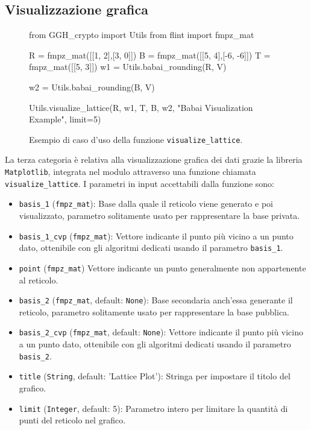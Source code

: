 \subsection{Visualizzazione grafica}

\begin{figure}[h]
    \begin{python}
        from GGH_crypto import Utils
        from flint import fmpz_mat

        R = fmpz_mat([[1, 2],[3, 0]])
        B = fmpz_mat([[5, 4],[-6, -6]])
        T = fmpz_mat([[5, 3]])
        w1 = Utils.babai_rounding(R, V)

        w2 = Utils.babai_rounding(B, V)

        Utils.visualize_lattice(R, w1, T, B, w2, 
                        "Babai Visualization Example", limit=5)
    \end{python}
    \caption{Esempio di caso d'uso della funzione \texttt{visualize\_lattice}.}
    \label{fig:babaivisualizationcode}
\end{figure}

La terza categoria è relativa alla visualizzazione grafica dei dati grazie la libreria
\texttt{Matplotlib}, integrata nel modulo attraverso una funzione chiamata 
\texttt{visualize\_lattice}. I parametri in input accettabili dalla funzione sono:
\begin{itemize}
    \item \texttt{basis\_1} (\texttt{fmpz\_mat}): 
    Base dalla quale il reticolo viene generato e poi visualizzato, parametro solitamente
    usato per rappresentare la base privata. 
    \item \texttt{basis\_1\_cvp} (\texttt{fmpz\_mat}): 
    Vettore indicante il punto più vicino a un punto dato, ottenibile con gli algoritmi 
    dedicati usando il parametro \texttt{basis\_1}. 
    \item \texttt{point} (\texttt{fmpz\_mat})
    Vettore indicante un punto generalmente non appartenente al reticolo.
    \item \texttt{basis\_2} (\texttt{fmpz\_mat}, default: \texttt{None}): 
    Base secondaria anch'essa generante il reticolo, parametro solitamente
    usato per rappresentare la base pubblica. 
    \item \texttt{basis\_2\_cvp} (\texttt{fmpz\_mat}, default: \texttt{None}): 
    Vettore indicante il punto più vicino a un punto dato, ottenibile con gli algoritmi 
    dedicati usando il parametro \texttt{basis\_2}. 
    \item \texttt{title} (\texttt{String}, default: 'Lattice Plot'): 
    Stringa per impostare il titolo del grafico. 
    \item \texttt{limit} (\texttt{Integer}, default: 5): 
    Parametro intero per limitare la quantità di punti del reticolo nel grafico. 
\end{itemize}

